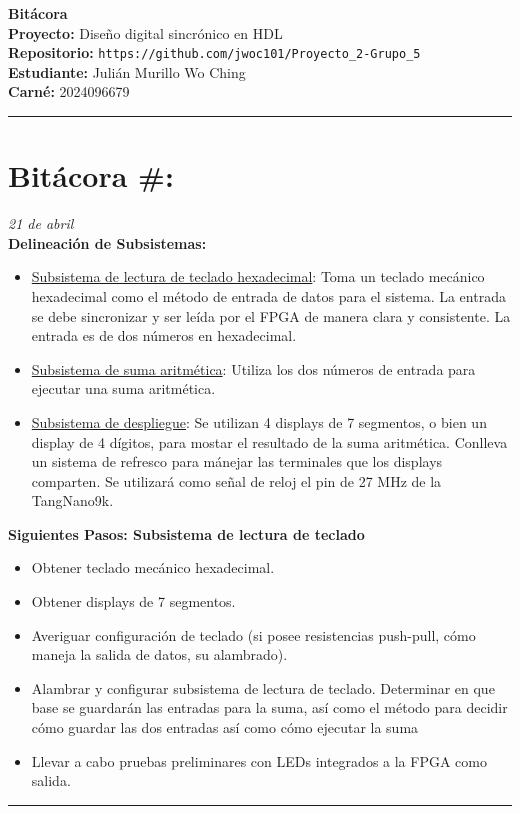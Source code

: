 \documentclass[11pt]{article}
\newcounter{entrycount}
\newcommand{\logentry}[3]{%
  \refstepcounter{entrycount}%
  \section*{Bitácora \#\theentrycount: #1}%
  \hfill\textit{#2}\\[0.2cm]
  #3
  \vspace{0.5cm}
  \hrule
  \vspace{0.5cm}
}
\begin{document}
\begin{center}
    {\huge \textbf{Bitácora}}\\[0.3cm]
    {\large \textbf{Proyecto:}} Diseño digital sincrónico en HDL\\[0.2cm]
    {\large \textbf{Repositorio:}} \texttt{https://github.com/jwoc101/Proyecto\_2-Grupo\_5}\\[0.2cm]
    {\large \textbf{Estudiante:}} Julián Murillo Wo Ching\\[0.2cm]
    {\large \textbf{Carné:}} 2024096679\\[0.2cm]
\end{center}

\vspace{1cm}
\hrule
\vspace{0.5cm}


\logentry{}{21 de abril}{
    
	    \textbf{Delineación de Subsistemas:}
    	\begin{itemize}
    	\item \underline{Subsistema de lectura de teclado hexadecimal}: Toma un teclado mecánico hexadecimal como el método de entrada de datos para el sistema. La entrada se debe sincronizar y ser leída por el FPGA de manera clara y consistente. La entrada es de dos números en hexadecimal.  
    	\item \underline{Subsistema de suma aritmética}: Utiliza los dos números de entrada para ejecutar una suma aritmética.
    	\item \underline{Subsistema de despliegue}: Se utilizan 4 displays de 7 segmentos, o bien un display de 4 dígitos, para mostar el resultado de la suma aritmética. Conlleva un sistema de refresco para mánejar las terminales que los displays comparten. Se utilizará como señal de reloj el pin de 27 MHz de la TangNano9k.
    	\end{itemize}
    	
    	\vspace{1cm}
    	
    	\textbf{Siguientes Pasos: Subsistema de lectura de teclado} 
    	\begin{itemize}
    	\item Obtener teclado mecánico hexadecimal.
		\item Obtener displays de 7 segmentos.    	
    	\item Averiguar configuración de teclado (si posee resistencias push-pull, cómo maneja la salida de datos, su alambrado).
    	\item Alambrar y configurar subsistema de lectura de teclado. Determinar en que base se guardarán las entradas para la suma, así como el método para decidir cómo guardar las dos entradas así como cómo ejecutar la suma
    	\item Llevar a cabo pruebas preliminares con LEDs integrados a la FPGA como salida.
    	\end{itemize}
    	
    
}
\end{document}

